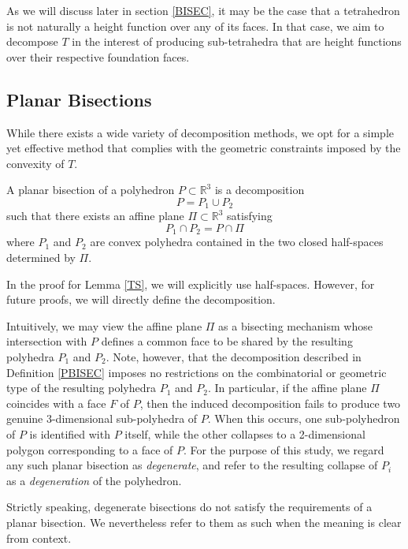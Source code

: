 \documentclass{mainresearch}
\begin{document}
As we will discuss later in section \ref{BISEC}, it may be the case that a tetrahedron is not naturally a height function over any of its faces. In that case, we aim to decompose $T$ in the interest of producing sub-tetrahedra that are height functions over their respective foundation faces. 


\subsection{Planar Bisections}
While there exists a wide variety of decomposition methods, we opt for a simple yet effective method that complies with the geometric constraints imposed by the convexity of $T$.
\begin{defin}\label{PBISEC}
	A planar bisection of a polyhedron $P \subset \mathbb{R}^3$ is a decomposition
	\begin{equation}\label{E1}
		P = P_1 \cup P_2
	\end{equation}
	such that there exists an affine plane $\Pi \subset \mathbb{R}^3$ satisfying
	\begin{equation}\label{E2}
		P_1 \cap P_2 = P \cap \Pi
	\end{equation}  
	where $P_1$ and $P_2$ are convex polyhedra contained in the two closed half-spaces determined by $\Pi$.
\end{defin}
\begin{remark}
	In the proof for Lemma \ref{TS}, we will explicitly use half-spaces. However, for future proofs, we will directly define the decomposition.
\end{remark}
Intuitively, we may view the affine plane $\Pi$ as a bisecting mechanism whose intersection with $P$ defines a common face to be shared by the resulting polyhedra $P_1$ and $P_2$. Note, however, that the decomposition described in Definition \ref{PBISEC} imposes no restrictions on the combinatorial or geometric type of the resulting polyhedra $P_1$ and $P_2$. In particular, if the affine plane $\Pi$ coincides with a face $F$ of $P$, then the induced decomposition fails to produce two genuine 3-dimensional sub-polyhedra of $P$. When this occurs, one sub-polyhedron of $P$ is identified with $P$ itself, while the other collapses to a 2-dimensional polygon corresponding to a face of $P$. For the purpose of this study, we regard any such planar bisection as \textit{degenerate}, and refer to the resulting collapse of $P_i$ as a \textit{degeneration} of the polyhedron.
\begin{remark}
	Strictly speaking, degenerate bisections do not satisfy the requirements of a planar bisection. We nevertheless refer to them as such when the meaning is clear from context.
\end{remark}
\end{document}
